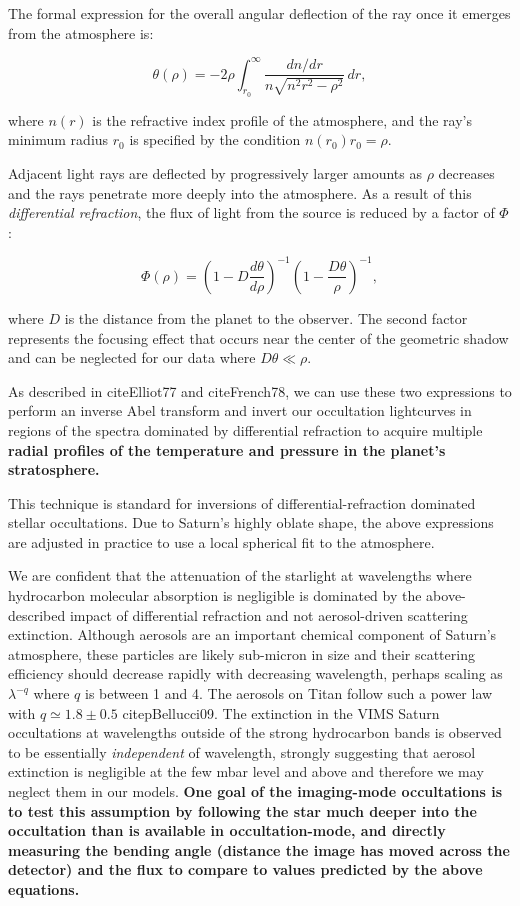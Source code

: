 \documentclass[12pt]{article}
\begin{document}
The formal expression for the overall angular deflection of the ray once it
emerges from the atmosphere is:

\begin{equation}
 \theta(\rho) = -2\rho \int_{r_0}^\infty \frac{dn/dr}{n\sqrt{n^2r^2 - \rho^2}}\, dr,
\end{equation}

\noindent where $n(r)$  is the refractive index profile of the atmosphere,
and the ray's minimum radius $r_0$ is specified by the condition $n(r_0)r_0 = \rho$.

Adjacent light rays are deflected by progressively larger amounts as $\rho$
decreases and the rays penetrate more deeply into the atmosphere. As a result
of this {\it differential refraction}, the flux of light from the source is
reduced by a factor of $\Phi$:

\begin{equation}
 \Phi(\rho) = \left( 1 - D\frac{d\theta}{d\rho} \right)^{-1}\left( 1 - \frac{D\theta}{\rho} \right)^{-1},
\label{eq:iso_flux}
\end{equation}

\noindent where $D$ is the distance from the planet to the observer. The second
factor represents the focusing effect that occurs near the center of the
geometric shadow and can be neglected for our data where $D\theta\ll\rho$.

As described in cite{Elliot77} and cite{French78}, we can use these two
expressions to perform an inverse Abel transform and invert our occultation
lightcurves in regions of the spectra dominated by differential refraction to
acquire multiple {\bf radial profiles of the temperature and pressure in the
planet's stratosphere.}

This technique is standard for inversions of differential-refraction dominated
stellar occultations.  Due to Saturn's highly oblate shape, the above
expressions are adjusted in practice to use a local spherical fit to the
atmosphere.

We are confident that the attenuation of the starlight at wavelengths where
hydrocarbon molecular absorption is negligible is dominated by the
above-described impact of differential refraction and not aerosol-driven
scattering extinction. Although aerosols are an important chemical component of
Saturn's atmosphere, these particles are likely sub-micron in size and their
scattering efficiency should decrease rapidly with decreasing wavelength,
perhaps scaling as $\lambda^{-q}$ where $q$ is between 1 and 4. The aerosols on
Titan follow such a power law with $q\simeq1.8\pm0.5$ citep{Bellucci09}. The
extinction in the VIMS Saturn occultations at wavelengths outside of the strong
hydrocarbon bands is observed to be essentially {\sl independent} of
wavelength, strongly suggesting that aerosol extinction is negligible at the
few mbar level and above and therefore we may neglect them in our models. {\bf
One goal of the imaging-mode occultations is to test this assumption by
following the star much deeper into the occultation than is available in
occultation-mode, and directly measuring the bending angle (distance the image
has moved across the detector) and the flux to compare to values predicted by
the above equations.}
\end{document}

